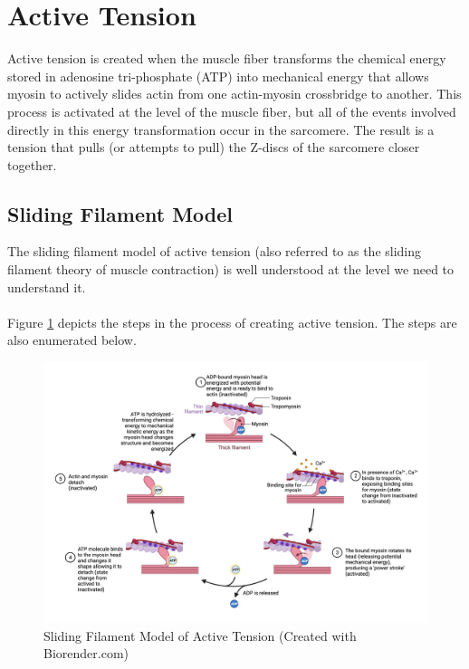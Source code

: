 \section{Active Tension}

Active tension is created when the muscle fiber transforms the chemical energy stored in adenosine tri-phosphate (ATP) into mechanical energy that allows myosin to actively slides actin from one actin-myosin crossbridge to another. This process is activated at the level of the muscle fiber, but all of the events involved directly in this energy transformation occur in the sarcomere. The result is a tension that pulls (or attempts to pull) the Z-discs of the sarcomere closer together.

\subsection{Sliding Filament Model}
The sliding filament model of active tension (also referred to as the sliding filament theory of muscle contraction) is well understood at the level we need to understand it.\footnotemark{} 
\paragraph{}
Figure \ref{fig:Sliding_Filament} depicts the steps in the process of creating active tension. The steps are also enumerated below.

\begin{figure}[!ht]
    \centering
    \includegraphics[width=1\linewidth]{./figure/Sliding_Filament.png}
    \caption{Sliding Filament Model of Active Tension \footnotesize{(Created with Biorender.com)}}
    \label{fig:Sliding_Filament}
\end{figure}

